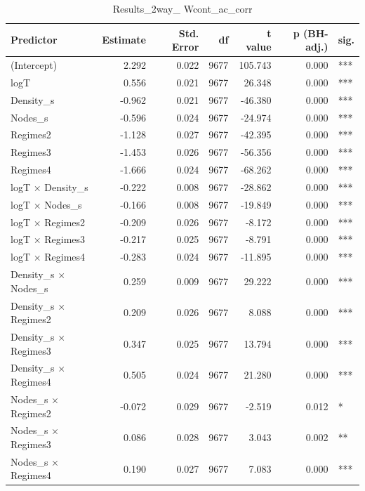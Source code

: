 \begin{table}[ht]
\centering
\begin{tabular}{lrrrrrl}
  \hline
Predictor & Estimate & Std. Error & df & t value & p (BH-adj.) & sig. \\ 
  \hline
(Intercept) & 2.292 & 0.022 & 9677 & 105.743 & 0.000 & *** \\ 
  logT & 0.556 & 0.021 & 9677 & 26.348 & 0.000 & *** \\ 
  Density\_s & -0.962 & 0.021 & 9677 & -46.380 & 0.000 & *** \\ 
  Nodes\_s & -0.596 & 0.024 & 9677 & -24.974 & 0.000 & *** \\ 
  Regimes2 & -1.128 & 0.027 & 9677 & -42.395 & 0.000 & *** \\ 
  Regimes3 & -1.453 & 0.026 & 9677 & -56.356 & 0.000 & *** \\ 
  Regimes4 & -1.666 & 0.024 & 9677 & -68.262 & 0.000 & *** \\ 
  logT × Density\_s & -0.222 & 0.008 & 9677 & -28.862 & 0.000 & *** \\ 
  logT × Nodes\_s & -0.166 & 0.008 & 9677 & -19.849 & 0.000 & *** \\ 
  logT × Regimes2 & -0.209 & 0.026 & 9677 & -8.172 & 0.000 & *** \\ 
  logT × Regimes3 & -0.217 & 0.025 & 9677 & -8.791 & 0.000 & *** \\ 
  logT × Regimes4 & -0.283 & 0.024 & 9677 & -11.895 & 0.000 & *** \\ 
  Density\_s × Nodes\_s & 0.259 & 0.009 & 9677 & 29.222 & 0.000 & *** \\ 
  Density\_s × Regimes2 & 0.209 & 0.026 & 9677 & 8.088 & 0.000 & *** \\ 
  Density\_s × Regimes3 & 0.347 & 0.025 & 9677 & 13.794 & 0.000 & *** \\ 
  Density\_s × Regimes4 & 0.505 & 0.024 & 9677 & 21.280 & 0.000 & *** \\ 
  Nodes\_s × Regimes2 & -0.072 & 0.029 & 9677 & -2.519 & 0.012 & * \\ 
  Nodes\_s × Regimes3 & 0.086 & 0.028 & 9677 & 3.043 & 0.002 & ** \\ 
  Nodes\_s × Regimes4 & 0.190 & 0.027 & 9677 & 7.083 & 0.000 & *** \\ 
   \hline
\end{tabular}
\caption{Results_2way_ Wcont_ac_corr} 
\end{table}
